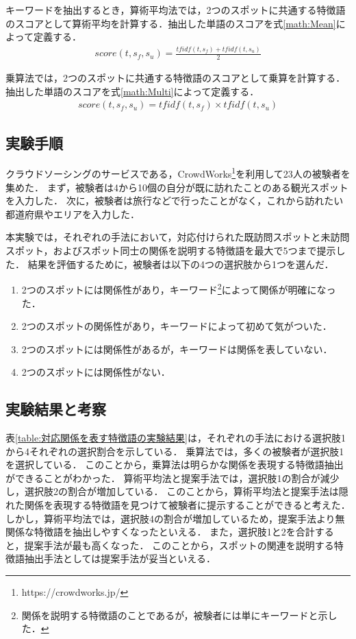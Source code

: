\documentclass[submit]{ipsj}
\begin{document}
キーワードを抽出するとき，算術平均法では，2つのスポットに共通する特徴語のスコアとして算術平均を計算する．抽出した単語のスコアを式\ref{math:Mean}によって定義する．
\begin{eqnarray}
  score(t,s_f,s_u) = \frac{tfidf(t,s_f) + tfidf(t,s_u)}{2}
  \label{math:Mean}
\end{eqnarray}

乗算法では，2つのスポットに共通する特徴語のスコアとして乗算を計算する．抽出した単語のスコアを式\ref{math:Multi}によって定義する．
\begin{eqnarray}
  score(t,s_f,s_u) = tfidf(t,s_f) \times tfidf(t,s_u)
  \label{math:Multi}
\end{eqnarray}

\subsection{実験手順}
\label{subsec:実験手順}
クラウドソーシングのサービスである，CrowdWorks\footnote{https://crowdworks.jp/}を利用して23人の被験者を集めた．
まず，被験者は4から10個の自分が既に訪れたことのある観光スポットを入力した．
次に，被験者は旅行などで行ったことがなく，これから訪れたい都道府県やエリアを入力した．

本実験では，それぞれの手法において，対応付けられた既訪問スポットと未訪問スポット，およびスポット同士の関係を説明する特徴語を最大で5つまで提示した．
結果を評価するために，被験者は以下の4つの選択肢から1つを選んだ．
\begin{enumerate}
  \item 2つのスポットには関係性があり，キーワード\footnote{関係を説明する特徴語のことであるが，被験者には単にキーワードと示した．}によって関係が明確になった．
  \item 2つのスポットの関係性があり，キーワードによって初めて気がついた．
  \item 2つのスポットには関係性があるが，キーワードは関係を表していない．
  \item 2つのスポットには関係性がない．
\end{enumerate}
\subsection{実験結果と考察}
表\ref{table:対応関係を表す特徴語の実験結果}は，それぞれの手法における選択肢1から4それぞれの選択割合を示している．
乗算法では，多くの被験者が選択肢1を選択している．
このことから，乗算法は明らかな関係を表現する特徴語抽出ができることがわかった．
算術平均法と提案手法では，選択肢1の割合が減少し，選択肢2の割合が増加している．
このことから，算術平均法と提案手法は隠れた関係を表現する特徴語を見つけて被験者に提示することができると考えた．
しかし，算術平均法では，選択肢4の割合が増加しているため，提案手法より無関係な特徴語を抽出しやすくなったといえる．
また，選択肢1と2を合計すると，提案手法が最も高くなった．
このことから，スポットの関連を説明する特徴語抽出手法としては提案手法が妥当といえる．
\end{document}

